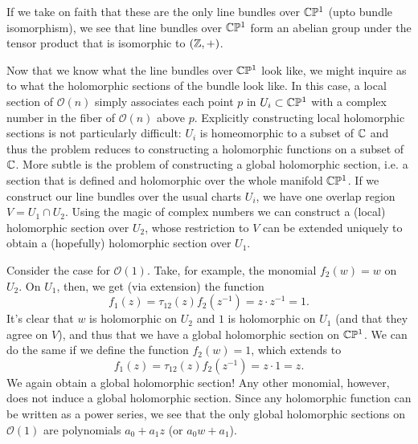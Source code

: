 \documentclass{../../mathnotes}
\begin{document}
If we take on faith that these are the only line bundles over $\mathbb{C}\mathbb{P}^1$ (upto bundle isomorphism), we see that line bundles over $\mathbb{C}\mathbb{P}^1$ form an abelian
group under the tensor product that is isomorphic to $(\mathbb{Z},+)$.

Now that we know what the line bundles over $\mathbb{C}\mathbb{P}^1$ look like, we might inquire as to what the holomorphic sections of the bundle look like. In this
case, a local section of $\mathcal{O}(n)$ simply associates each point $p$ in $U_i\subset\mathbb{C}\mathbb{P}^1$ with a complex number in the fiber of $\mathcal{O}(n)$ above $p$.
Explicitly constructing local holomorphic sections is not particularly difficult: $U_i$ is homeomorphic to a subset of $\mathbb{C}$ and thus the problem reduces to constructing
a holomorphic functions on a subset of $\mathbb{C}$. More subtle is the problem of constructing a global holomorphic section, i.e. a section that is defined and
holomorphic over the whole manifold $\mathbb{C}\mathbb{P}^1$. If we construct our line bundles over the usual charts $U_i$, we have one overlap region $V=U_1\cap U_2$.
Using the magic of complex numbers we can construct a (local) holomorphic section over $U_2$, whose restriction to $V$ can be extended uniquely to
obtain a (hopefully) holomorphic section over $U_1$. 

Consider the case for $\mathcal{O}(1)$. Take, for example, the monomial $f_2(w)=w$ on $U_2$. On $U_1$, then, we get (via extension) the
function
\[f_1(z)=\tau_{12}(z)f_2(z^{-1})=z\cdot z^{-1}=1.\]
It's clear that $w$ is holomorphic on $U_2$ and $1$ is holomorphic on $U_1$
(and that they agree on $V$), and thus
that we have a global holomorphic section on $\mathbb{C}\mathbb{P}^1$. We can do the same if we define the function $f_2(w)=1$, which extends to
\[f_1(z)=\tau_{12}(z)f_2(z^{-1})=z\cdot1=z.\]
We again obtain a global holomorphic section! Any other monomial, however, does not
induce a global holomorphic section. Since any holomorphic function can be written as a power series, we see that the only global holomorphic
sections on $\mathcal{O}(1)$ are polynomials $a_0+a_1z$ (or $a_0w+a_1$).
\end{document}

